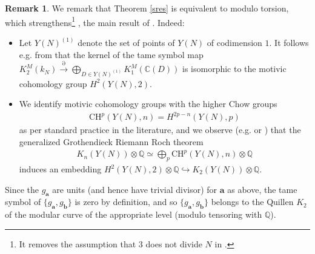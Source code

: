 \documentclass[12pt,amstex,amssymb]{article}
\theoremstyle{plain}
\theoremstyle{definition}
\newtheorem{remark}[theorem]{Remark}
\def\cM{{\cal M}}
\def\C{{\mathbb C}}
\def\Q{{\mathbb Q}}
\newcommand{\be}{\begin{eqnarray*}}
\newcommand{\ee}{\end{eqnarray*}}
\newcommand{\ba}{\mathbf{a}}
\newcommand{\bb}{\mathbf{b}}
\begin{document}
\begin{remark} 
We remark that Theorem \ref{sres} is equivalent to 
\cite[Theorem 4.1]{Bru2} modulo torsion, which strengthens\footnote{It removes the assumption that $3$ does not divide $N$ in \cite{Bru}.} \cite[(7) Theorem 1.4, (5) Definition 1.2]{Bru}, the main result of \cite{Bru}.
Indeed:
\begin{itemize}
	\item Let $Y(N)^{(1)}$ denote the set of points of $Y(N)$ of codimension $1$. It follows e.g. from \cite[Section 2.1, especially (2.5)]{SV} that the kernel of the tame symbol map
	$K^M_2(k_N) \xrightarrow{\partial} \bigoplus_{D\in Y(N)^{(1)}} K_1^M(\C(D))$ is isomorphic to the motivic cohomology group $H^2(Y(N), 2)$.
	\item We identify motivic cohomology groups with the higher Chow groups 
	\be
	\mathrm{CH}^p(Y(N), n) = H^{2p-n} (Y(N), p)
        \ee
         as per standard practice in the literature, and we observe (e.g. \cite[p. 177]{Totaro} or \cite{Bloch}) that the generalized Grothendieck Riemann Roch theorem 
	\be
	K_n(Y(N)) \otimes \Q \simeq \bigoplus_p \mathrm{CH}^p(Y(N), n) \otimes \Q
	\ee
	induces an embedding 
		$H^2(Y(N),2)\otimes \Q \hookrightarrow K_2(Y(N))\otimes \Q$.
\end{itemize}
Since the $g_\ba$ are units (and hence have trivial divisor) for $\ba$ as above,  the tame symbol of $\{g_\ba, g_\bb\}$ is zero by definition, and so $\{g_\ba, g_\bb\}$ belongs to the Quillen $K_2$ of the modular curve of the appropriate level  (modulo tensoring with $\Q$).

\end{remark}
\end{document}
